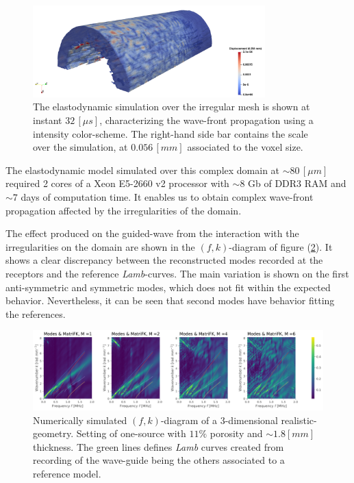 \begin{figure}[!h]
	\centering
	\includegraphics[width=0.8\textwidth]{images/ImgExt/Cortical3dsc04Mesh1000Fill-T80.png}
	\caption{The elastodynamic simulation over the irregular mesh is shown at instant $32 \, [\mu s]$, characterizing the wave-front propagation using a intensity color-scheme. The right-hand side bar contains the scale over the simulation, at $0.056 \, [mm]$ associated to the voxel size.}
	\label{HomBone-TimeStep}
\end{figure} 

\begin{rem}
The elastodynamic model simulated over this complex domain at $\sim 80 \, [\mu m]$ required 2 cores of a Xeon E5-2660 v2 processor with $\sim 8$ Gb of DDR3 RAM and $\sim 7$ days of computation time. It enables us to obtain complex wave-front propagation affected by the irregularities of the domain.
\end{rem}

The effect produced on the guided-wave from the interaction with the irregularities on the domain are shown in the $(f,k)$-diagram of figure (\ref{FK-HomBone-DiagramS1P11M18}). It shows a clear discrepancy between the reconstructed modes recorded at the receptors and the reference \textit{Lamb}-curves. The main variation is shown on the first anti-symmetric and symmetric modes, which does not fit within the expected behavior. Nevertheless, it can be seen that second modes have behavior fitting the references.  
\begin{figure}[!h]
	\centering
	\includegraphics[width=\textwidth]{images/ClusterSim/3DCorticalS1000TimeP11TransIsoFKW18.pdf}
	\caption{Numerically simulated $(f,k)$-diagram of a 3-dimensional realistic-geometry. Setting of one-source with $11\%$ porosity and $\sim 1.8 [mm]$ thickness. The green lines defines \textit{Lamb} curves created from recording of the wave-guide being the others associated to a reference model.}
	\label{FK-HomBone-DiagramS1P11M18}
\end{figure} 

